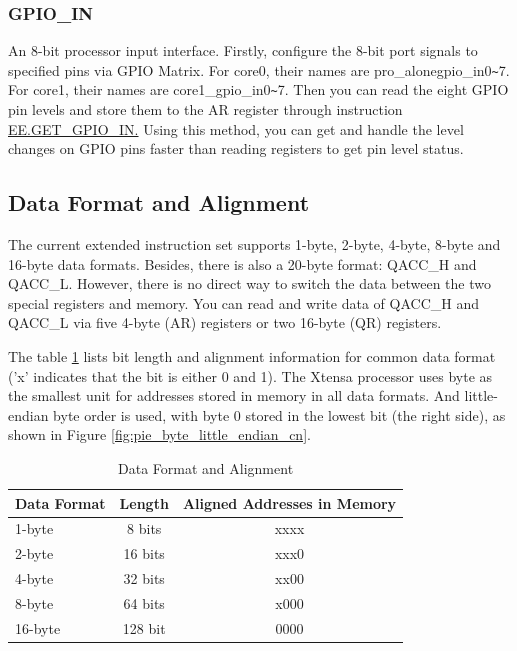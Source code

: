 \documentclass[main\_\_EN.tex]{subfiles}
\begin{document}
\subsubsection{GPIO\_IN}

An 8-bit processor input interface. Firstly, configure the 8-bit port signals to specified pins via GPIO Matrix. For core0, their names are pro\_alonegpio\_in0\verb+~+7. For core1, their names are core1\_gpio\_in0\verb+~+7. Then you can read the eight GPIO pin levels and store them to the AR register through instruction \hyperref[instruction:EEGETGPIOIN]{EE.GET\_GPIO\_IN.} Using this method, you can get and handle the level changes on GPIO pins faster than reading registers to get pin level status.

\subsection{Data Format and Alignment}
\label{sec:pie-data-align}

The current extended instruction set supports 1-byte, 2-byte, 4-byte, 8-byte and 16-byte data formats. Besides, there is also a 20-byte format: QACC\_H and QACC\_L. However, there is no direct way to switch the data between the two special registers and memory. You can read and write data of QACC\_H and QACC\_L via five 4-byte (AR) registers or two 16-byte (QR) registers.

The table \ref{tab:pie_data_format_align} lists bit length and alignment information for common data format ('x' indicates that the bit is either 0 and 1). The Xtensa processor uses byte as the smallest unit for addresses stored in memory in all data formats. And little-endian byte order is used, with byte 0 stored in the lowest bit (the right side), as shown in Figure \ref{fig:pie_byte_little_endian_cn}.


\begin{table}[H]
\centering
\caption{Data Format and Alignment}
\label{tab:pie_data_format_align}
\begin{tabular}{|l|c|c|}
\hline
    \rowcolor{lightgray}
    \textbf{Data Format}  & \textbf{Length} & \textbf{Aligned Addresses in Memory} \\\hline

    1-byte & 8 bits & xxxx \\\hline
    2-byte & 16 bits & xxx0 \\\hline
    4-byte & 32 bits & xx00 \\\hline
    8-byte & 64 bits & x000 \\\hline
    16-byte & 128 bit & 0000 \\\hline
    \end{tabular}
\end{table}
\end{document}
